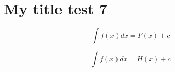 \documentclass{scrbook}
\newenvironment{myeq}{\useshortskip\equation}{\endequation}
\begin{document}
  \chapter{My title test 7}
    \blindtext  
    \begin{mdframed}
      \useshortskip
      \begin{equation}\label{mai:eq1}
        \boxed{\int f(x) dx = F(x) + c}
      \end{equation}
    \end{mdframed}

    \blindtext
    \begin{mdframed}
      \begin{myeq}\label{mai:eq2}
      \end{myeq}
    \end{mdframed}     
    \blindtext
    \begin{mdframed}
      \begin{equation}\label{mai:eq3}
        \boxed{\int f(x) dx = H(x) + c}
      \end{equation}
    \end{mdframed}  
\end{document}
